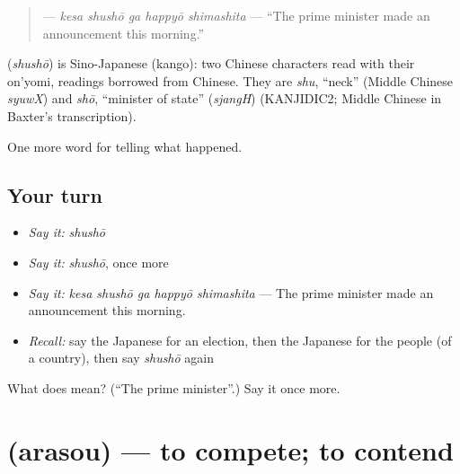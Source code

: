 \begin{quote}
\textbf{  } — \emph{kesa shushō ga happyō shimashita} — \textquotedblleft{}The prime minister made an announcement this morning.\textquotedblright{}
\end{quote}

\begin{cousinweb}
\textbf{} (\emph{shushō}) is Sino-Japanese (kango): two Chinese characters read with their on'yomi, readings borrowed from Chinese. They are \emph{shu}, \textquotedblleft{}neck\textquotedblright{} (Middle Chinese \emph{syuwX}) and \emph{shō}, \textquotedblleft{}minister of state\textquotedblright{} (\emph{sjangH}) (KANJIDIC2; Middle Chinese in Baxter's transcription).
\end{cousinweb}

\begin{grammarlens}[title={What you've built}]
One more word for telling what happened.
\end{grammarlens}

\subsection*{Your turn}
\begin{itemize}
\raggedright
  \item \emph{Say it:} \emph{shushō}
  \item \emph{Say it:} \emph{shushō}, once more
  \item \emph{Say it:} \emph{kesa shushō ga happyō shimashita} — The prime minister made an announcement this morning.
  \item \emph{Recall:} say the Japanese for an election, then the Japanese for the people (of a country), then say \emph{shushō} again
\end{itemize}

\begin{tcolorbox}[breakable,colback=teal!4,colframe=teal!35!black,title={Before you move on}]
What does  mean? (\textquotedblleft{}The prime minister\textquotedblright{}.) Say it once more.
\end{tcolorbox}
\section[\texorpdfstring{\ja{あらそう} (arasou)}{あらそう (arasou)}]{ (arasou) — to compete; to contend}

\label{lesson:JA-C284-arasou}



